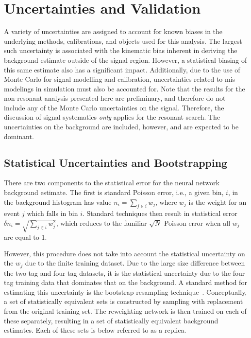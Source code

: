 \chapter{Uncertainties and Validation}
\label{chap:bbbb-uncert}

A variety of uncertainties are assigned to account for known biases in the
underlying methods, calibrations, and objects used for this analysis. The
largest such uncertainty is associated with the kinematic bias inherent in
deriving the background estimate outside of the signal region. However, a
statistical biasing of this same estimate also has a significant impact.
Additionally, due to the use of Monte Carlo for signal modelling and \btag
calibration, uncertainties related to mis-modelings in simulation must also be
accounted for. Note that the results for the non-resonant analysis presented here are 
preliminary, and therefore do not include any of the Monte Carlo uncertainties on the signal.
Therefore, the discussion of signal systematics \emph{only} applies for the resonant search. The 
uncertainties on the background are included, however, and are expected to be dominant.

\section{Statistical Uncertainties and Bootstrapping}
There are two components to the statistical error for the neural network
background estimate. The first is standard Poisson error, i.e., a given bin,
$i$, in the background histogram has value $n_i = \sum\limits_{j\in i} w_j$,
where $w_j$ is the weight for an event $j$ which falls in bin $i$. Standard
techniques then result in statistical error $\delta n_i =
	\sqrt{\sum\limits_{j\in i} w_j^2}$, which reduces to the familiar $\sqrt{N}$
Poisson error when all $w_j$ are equal to 1.

However, this procedure does not take into account the statistical uncertainty
on the $w_j$ due to the finite training dataset. Due to the large size
difference between the two tag and four tag datasets, it is the statistical
uncertainty due to the four tag training data that dominates that on the
background. A standard method for estimating this uncertainty is the bootstrap
resampling technique~\cite{Bootstrap}. Conceptually, a set of statistically
equivalent sets is constructed by sampling with replacement from the original
training set. The reweighting network is then trained on each of these
separately, resulting in a set of statistically equivalent background estimates.
Each of these sets is below referred to as a replica.

